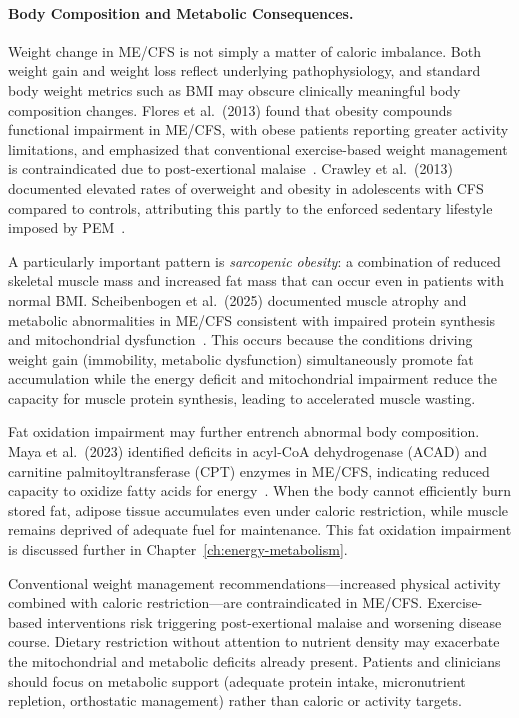 \paragraph{Body Composition and Metabolic Consequences.}
Weight change in ME/CFS is not simply a matter of caloric imbalance. Both weight gain and weight loss reflect underlying pathophysiology, and standard body weight metrics such as BMI may obscure clinically meaningful body composition changes. Flores et al.\ (2013) found that obesity compounds functional impairment in ME/CFS, with obese patients reporting greater activity limitations, and emphasized that conventional exercise-based weight management is contraindicated due to post-exertional malaise~\cite{Flores2013obesity}. Crawley et al.\ (2013) documented elevated rates of overweight and obesity in adolescents with CFS compared to controls, attributing this partly to the enforced sedentary lifestyle imposed by PEM~\cite{Crawley2013obesity}.

A particularly important pattern is \emph{sarcopenic obesity}: a combination of reduced skeletal muscle mass and increased fat mass that can occur even in patients with normal BMI. Scheibenbogen et al.\ (2025) documented muscle atrophy and metabolic abnormalities in ME/CFS consistent with impaired protein synthesis and mitochondrial dysfunction~\cite{Scheibenbogen2025muscle}. This occurs because the conditions driving weight gain (immobility, metabolic dysfunction) simultaneously promote fat accumulation while the energy deficit and mitochondrial impairment reduce the capacity for muscle protein synthesis, leading to accelerated muscle wasting.

Fat oxidation impairment may further entrench abnormal body composition. Maya et al.\ (2023) identified deficits in acyl-CoA dehydrogenase (ACAD) and carnitine palmitoyltransferase (CPT) enzymes in ME/CFS, indicating reduced capacity to oxidize fatty acids for energy~\cite{Maya2023fattyacid}. When the body cannot efficiently burn stored fat, adipose tissue accumulates even under caloric restriction, while muscle remains deprived of adequate fuel for maintenance. This fat oxidation impairment is discussed further in Chapter~\ref{ch:energy-metabolism}.

\begin{warning}
\label{warn:weight-management}
Conventional weight management recommendations---increased physical activity combined with caloric restriction---are contraindicated in ME/CFS. Exercise-based interventions risk triggering post-exertional malaise and worsening disease course. Dietary restriction without attention to nutrient density may exacerbate the mitochondrial and metabolic deficits already present. Patients and clinicians should focus on metabolic support (adequate protein intake, micronutrient repletion, orthostatic management) rather than caloric or activity targets.
\end{warning}

